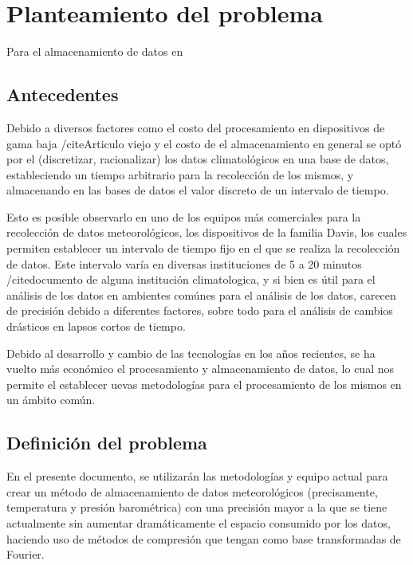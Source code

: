 \section{Planteamiento del problema}

Para el almacenamiento de datos en

\subsection{Antecedentes}

Debido a diversos factores como el costo del procesamiento en dispositivos de gama baja /cite{Articulo viejo} y el costo de el almacenamiento en general \cite{Marshall_1994} se optó por el (discretizar, racionalizar) los datos climatológicos en una base de datos, estableciendo un tiempo arbitrario para la recolección de los mismos, y almacenando en las bases de datos el valor discreto de un intervalo de tiempo.

Esto es posible observarlo en uno de los equipos más comerciales para la recolección de datos meteorológicos, los dispositivos de la familia Davis, los cuales permiten establecer un intervalo de tiempo fijo en el que se realiza la recolección de datos. Este intervalo varía en diversas instituciones de 5 a 20 minutos /cite{documento de alguna institución climatologica}, y si bien es útil para el análisis de los datos en ambientes comúnes para el análisis de los datos, carecen de precisión debido a diferentes factores, sobre todo para el análisis de cambios drásticos en lapsos cortos de tiempo.

Debido al desarrollo y cambio de las tecnologías en los años recientes, se ha vuelto más económico el procesamiento y almacenamiento de datos, lo cual nos permite el establecer uevas metodologías para el procesamiento de los mismos en un ámbito común.

\subsection{Definición del problema}

En el presente documento, se utilizarán las metodologías y equipo actual para crear un método de almacenamiento de datos meteorológicos (precisamente, temperatura y presión barométrica) con una precisión mayor a la que se tiene actualmente sin aumentar dramáticamente el espacio consumido por los datos, haciendo uso de métodos de compresión que tengan como base transformadas de Fourier.
